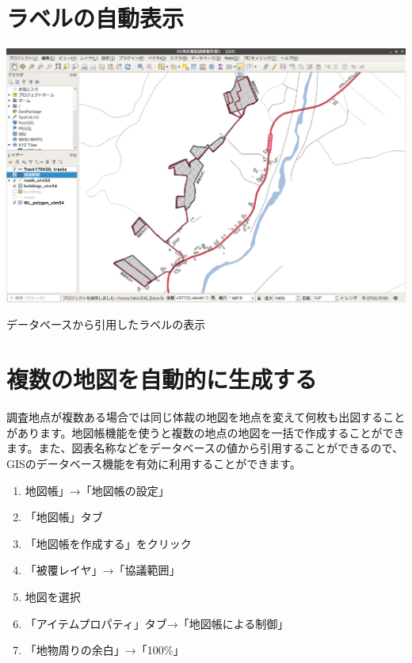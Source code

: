 \documentclass[14Q,twocolumn]{jsarticle}
\makeatletter
\newenvironment{figurehere}
  {\def\@captype{figure}}
  {}
\makeatother
\begin{document}
\section{ラベルの自動表示}
\begin{figurehere}
\centering
\includegraphics[width=1\linewidth]{62.png}
\caption{データベースから引用したラベルの表示}
\end{figurehere}

\section{複数の地図を自動的に生成する}
調査地点が複数ある場合では同じ体裁の地図を地点を変えて何枚も出図することがあります。地図帳機能を使うと複数の地点の地図を一括で作成することができます。また、図表名称などをデータベースの値から引用することができるので、GISのデータベース機能を有効に利用することができます。

\begin{enumerate}
\item 地図帳」→「地図帳の設定」
\item 「地図帳」タブ
\item 「地図帳を作成する」をクリック
\item 「被覆レイヤ」→「協議範囲」
\item  地図を選択
\item  「アイテムプロパティ」タブ→「地図帳による制御」
\item  「地物周りの余白」→「100\%」
\end{enumerate}
\end{document}
